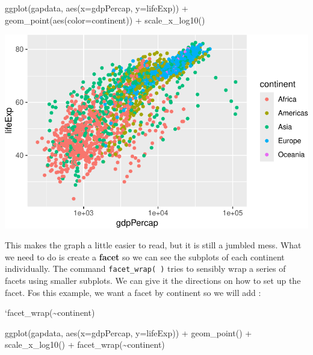 \documentclass[
  letterpaper,
  DIV=11,
  numbers=noendperiod]{scrreprt}
\newenvironment{Shaded}{\begin{snugshade}}{\end{snugshade}}
\newcommand{\AttributeTok}[1]{\textcolor[rgb]{0.40,0.45,0.13}{#1}}
\newcommand{\FunctionTok}[1]{\textcolor[rgb]{0.28,0.35,0.67}{#1}}
\newcommand{\NormalTok}[1]{\textcolor[rgb]{0.00,0.23,0.31}{#1}}
\newcommand{\SpecialCharTok}[1]{\textcolor[rgb]{0.37,0.37,0.37}{#1}}
\begin{document}
\begin{Shaded}
\begin{Highlighting}[]
  \FunctionTok{ggplot}\NormalTok{(gapdata, }\FunctionTok{aes}\NormalTok{(}\AttributeTok{x=}\NormalTok{gdpPercap, }\AttributeTok{y=}\NormalTok{lifeExp)) }\SpecialCharTok{+}
  \FunctionTok{geom\_point}\NormalTok{(}\FunctionTok{aes}\NormalTok{(}\AttributeTok{color=}\NormalTok{continent)) }\SpecialCharTok{+}
  \FunctionTok{scale\_x\_log10}\NormalTok{()}
\end{Highlighting}
\end{Shaded}

\includegraphics{Advanced_Scatterplot_Techniques_files/figure-pdf/unnamed-chunk-16-1.pdf}

This makes the graph a little easier to read, but it is still a jumbled
mess. What we need to do is create a \textbf{facet} so we can see the
subplots of each continent individually. The command
\texttt{facet\_wrap(\ )} tries to sensibly wrap a series of facets using
smaller subplots. We can give it the directions on how to set up the
facet. Fos this example, we want a facet by continent so we will add :

`facet\_wrap(\textasciitilde continent)

\begin{Shaded}
\begin{Highlighting}[]
 \FunctionTok{ggplot}\NormalTok{(gapdata, }\FunctionTok{aes}\NormalTok{(}\AttributeTok{x=}\NormalTok{gdpPercap, }\AttributeTok{y=}\NormalTok{lifeExp)) }\SpecialCharTok{+}
  \FunctionTok{geom\_point}\NormalTok{() }\SpecialCharTok{+}
  \FunctionTok{scale\_x\_log10}\NormalTok{() }\SpecialCharTok{+}
  \FunctionTok{facet\_wrap}\NormalTok{(}\SpecialCharTok{\textasciitilde{}}\NormalTok{continent)}
\end{Highlighting}
\end{Shaded}
\end{document}
